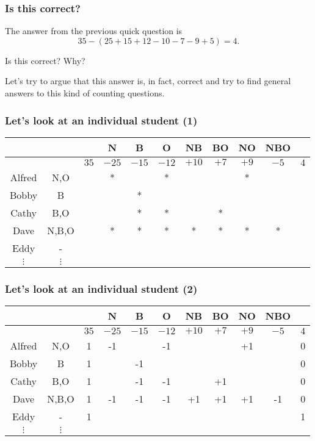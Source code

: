 \begin{frame}\frametitle{Is this correct?}
  The answer from the previous quick question is
  \[ 35 - (25 + 15 + 12 - 10 - 7 - 9 + 5) = 4.\]

  Is this correct?  Why?

  \pause

  \vspace{0.2in}

  Let's try to argue that this answer is, in fact, correct and try to
  find general answers to this kind of counting questions.
\end{frame}

\begin{frame}\frametitle{Let's look at an individual student (1)}
  {\small
  \begin{tabular}{c|c||c|c|c|c|c|c|c|c||c}
    & &  & N & B & O & NB & BO & NO & NBO & \\
    \hline
    & & $35$ & $-25$ & $-15$ & $-12$ & $+10$ & $+7$ & $+9$ & $-5$ & $4$ \\
    \hline
    Alfred & N,O & \pause * & * & & * & & & * & & \\
    Bobby & B & \pause * & & * & & & & & & \\
    Cathy & B,O & \pause * & & * & * & & * & & & \\
    Dave & N,B,O & \pause * & * & * & * & * & * & * & * & \\
    Eddy & - & \pause * & &  & & & & & & \\
    $\vdots$ & $\vdots$ & & & & & & & & & \\
  \end{tabular}
  }
\end{frame}

\begin{frame}\frametitle{Let's look at an individual student (2)}
  {\small
  \begin{tabular}{c|c||c|c|c|c|c|c|c|c||c}
    & &  & N & B & O & NB & BO & NO & NBO & \\
    \hline
    & & $35$ & $-25$ & $-15$ & $-12$ & $+10$ & $+7$ & $+9$ & $-5$ & $4$ \\
    \hline
    Alfred & N,O & 1 & -1 & & -1 & & & +1 & & 0 \\
    Bobby & B & 1 & & -1 & & & & & & 0 \\
    Cathy & B,O & 1 & & -1 & -1 & & +1 & & & 0 \\
    Dave & N,B,O & 1 & -1 & -1 & -1 & +1 & +1 & +1 & -1 & 0 \\
    Eddy & - & 1 & &  & & & & & & 1 \\
    $\vdots$ & $\vdots$ & & & & & & & & & \\
  \end{tabular}
  }
\end{frame}

